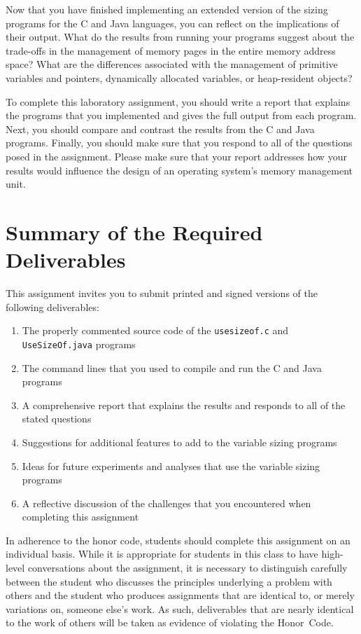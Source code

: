   Now that you have finished implementing an extended version of the sizing programs for the C and Java languages, you
  can reflect on the implications of their output. What do the results from running your programs suggest about the
  trade-offs in the management of memory pages in the entire memory address space? What are the differences associated
  with the management of primitive variables and pointers, dynamically allocated variables, or heap-resident objects? 
  
  To complete this laboratory assignment, you should write a report that explains the programs that you implemented and
  gives the full output from each program.  Next, you should compare and contrast the results from the C and Java
  programs.  Finally, you should make sure that you respond to all of the questions posed in the assignment. Please make
  sure that your report addresses how your results would influence the design of an operating system's memory
  management unit. 

\section*{Summary of the Required Deliverables}

This assignment invites you to submit printed and signed versions of the following deliverables: 

\begin{enumerate}

  \item The properly commented source code of the {\tt usesizeof.c} and {\tt UseSizeOf.java} programs

  \item The command lines that you used to compile and run the C and Java programs

  \item A comprehensive report that explains the results and responds to all of the stated questions 

  \item Suggestions for additional features to add to the variable sizing programs

  \item Ideas for future experiments and analyses that use the variable sizing programs

  \item A reflective discussion of the challenges that you encountered when completing this assignment

\end{enumerate}

In adherence to the honor code, students should complete this assignment on an individual basis. While it is appropriate
for students in this class to have high-level conversations about the assignment, it is necessary to distinguish
carefully between the student who discusses the principles underlying a problem with others and the student who produces
assignments that are identical to, or merely variations on, someone else's work.  As such, deliverables that are nearly
identical to the work of others will be taken as evidence of violating the \mbox{Honor Code}.  

  
